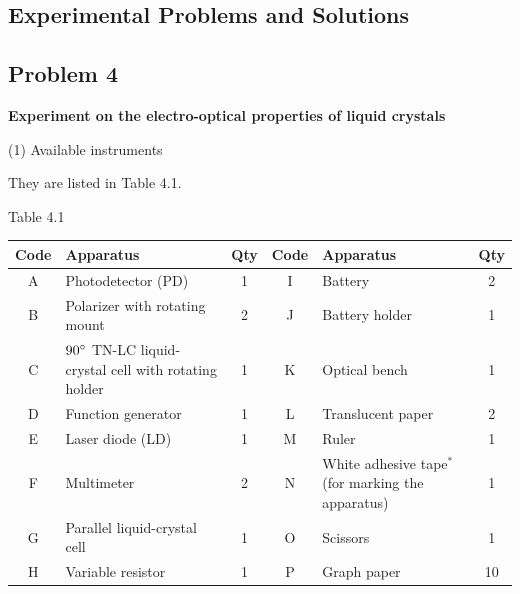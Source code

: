 \subsection*{Experimental Problems and Solutions}

\subsection*{Problem 4}

\noindent\textbf{Experiment on the electro-optical properties of liquid crystals}


(1) Available instruments

They are listed in Table 4.1.

\begin{center}
{\small Table 4.1}\\[2pt]
\footnotesize
\begin{tabular}{@{}c p{4.5cm} c c p{3.9cm} c@{}}
\toprule
Code & Apparatus & Qty & Code & Apparatus & Qty\\
\midrule
A & Photodetector (PD) & 1 & I & Battery & 2\\
B & Polarizer with rotating mount & 2 & J & Battery holder & 1\\
C & $90^{\circ}$ TN-LC liquid-crystal cell with rotating holder & 1 & K & Optical bench & 1\\
D & Function generator & 1 & L & Translucent paper & 2\\
E & Laser diode (LD) & 1 & M & Ruler & 1\\
F & Multimeter & 2 & N & White adhesive tape$^*$ (for marking the apparatus) & 1\\
G & Parallel liquid-crystal cell & 1 & O & Scissors & 1\\
H & Variable resistor & 1 & P & Graph paper & 10\\
\bottomrule
\end{tabular}
\end{center}


